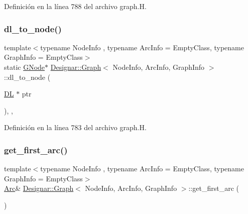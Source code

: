 Definición en la línea 788 del archivo graph.\+H.

\mbox{\label{class_designar_1_1_graph_ab6f1de18d2ec0c537fc1daa5b4a42e01}} 
\subsubsection{\texorpdfstring{dl\+\_\+to\+\_\+node()}{dl\_to\_node()}}
{\footnotesize\ttfamily template$<$typename Node\+Info , typename Arc\+Info  = Empty\+Class, typename Graph\+Info  = Empty\+Class$>$ \\
static \hyperlink{class_designar_1_1_graph_a7e61951db0bb9bfa8a2e317440d4e17f}{G\+Node}$\ast$ \hyperlink{class_designar_1_1_graph}{Designar\+::\+Graph}$<$ Node\+Info, Arc\+Info, Graph\+Info $>$\+::dl\+\_\+to\+\_\+node (\begin{DoxyParamCaption}\item[{\hyperlink{class_designar_1_1_d_l}{DL} $\ast$}]{ptr }\end{DoxyParamCaption})\hspace{0.3cm}{\ttfamily [inline]}, {\ttfamily [static]}, {\ttfamily [protected]}}



Definición en la línea 783 del archivo graph.\+H.

\mbox{\label{class_designar_1_1_graph_a6829f963f0db1fffbc535557f39ed877}} 
\subsubsection{\texorpdfstring{get\+\_\+first\+\_\+arc()}{get\_first\_arc()}\hspace{0.1cm}{\footnotesize\ttfamily [1/2]}}
{\footnotesize\ttfamily template$<$typename Node\+Info , typename Arc\+Info  = Empty\+Class, typename Graph\+Info  = Empty\+Class$>$ \\
\hyperlink{class_designar_1_1_graph_a74c730ef4ce2d20f998d72bd25c2b5bf}{Arc}\& \hyperlink{class_designar_1_1_graph}{Designar\+::\+Graph}$<$ Node\+Info, Arc\+Info, Graph\+Info $>$\+::get\+\_\+first\+\_\+arc (\begin{DoxyParamCaption}{ }\end{DoxyParamCaption})\hspace{0.3cm}{\ttfamily [inline]}}




